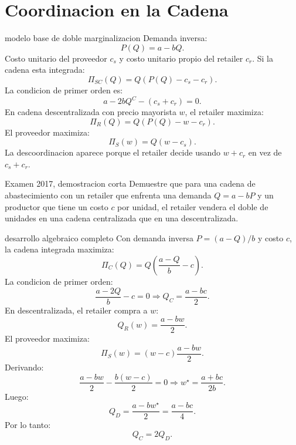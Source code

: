 \section{Coordinacion en la Cadena}

\begin{materia}{modelo base de doble marginalizacion}
Demanda inversa:
\[
  P(Q)=a-bQ.
\]
Costo unitario del proveedor $c_s$ y costo unitario propio del retailer $c_r$. Si la cadena esta integrada:
\[
  \Pi_{SC}(Q)=Q(P(Q)-c_s-c_r).
\]
La condicion de primer orden es:
\[
  a-2bQ^C-(c_s+c_r)=0.
\]
En cadena descentralizada con precio mayorista $w$, el retailer maximiza:
\[
  \Pi_R(Q)=Q(P(Q)-w-c_r).
\]
El proveedor maximiza:
\[
  \Pi_S(w)=Q(w-c_s).
\]
La descoordinacion aparece porque el retailer decide usando $w+c_r$ en vez de $c_s+c_r$.
\end{materia}

\begin{enunciado}{Examen 2017, demostracion corta}
Demuestre que para una cadena de abastecimiento con un retailer que enfrenta una demanda $Q=a-bP$ y un productor que tiene un costo $c$ por unidad, el retailer vendera el doble de unidades en una cadena centralizada que en una descentralizada.
\end{enunciado}

\begin{pautacompleta}{desarrollo algebraico completo}
Con demanda inversa $P=(a-Q)/b$ y costo $c$, la cadena integrada maximiza:
\[
  \Pi_C(Q)=Q\left(\frac{a-Q}{b}-c\right).
\]
La condicion de primer orden:
\[
  \frac{a-2Q}{b}-c=0
  \Rightarrow
  Q_C=\frac{a-bc}{2}.
\]
En descentralizada, el retailer compra a $w$:
\[
  Q_R(w)=\frac{a-bw}{2}.
\]
El proveedor maximiza:
\[
  \Pi_S(w)=(w-c)\frac{a-bw}{2}.
\]
Derivando:
\[
  \frac{a-bw}{2}-\frac{b(w-c)}{2}=0
  \Rightarrow
  w^\star=\frac{a+bc}{2b}.
\]
Luego:
\[
  Q_D=\frac{a-bw^\star}{2}
  =\frac{a-bc}{4}.
\]
Por lo tanto:
\[
  Q_C=2Q_D.
\]
\end{pautacompleta}

